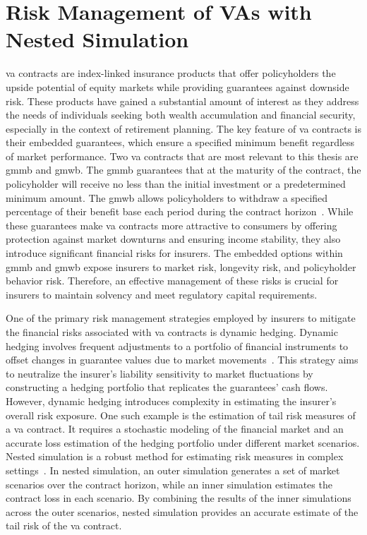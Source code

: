 \section{Risk Management of VAs with Nested Simulation}

\gls{va} contracts are index-linked insurance products that offer policyholders the upside potential of equity markets while providing guarantees against downside risk.
These products have gained a substantial amount of interest as they address the needs of individuals seeking both wealth accumulation and financial security, especially in the context of retirement planning.
The key feature of \gls{va} contracts is their embedded guarantees, which ensure a specified minimum benefit regardless of market performance.
Two \gls{va} contracts that are most relevant to this thesis are \gls{gmmb} and \gls{gmwb}.
The \gls{gmmb} guarantees that at the maturity of the contract, the policyholder will receive no less than the initial investment or a predetermined minimum amount.
The \gls{gmwb} allows policyholders to withdraw a specified percentage of their benefit base each period during the contract horizon~\citep{hardy2003investment}.
While these guarantees make \gls{va} contracts more attractive to consumers by offering protection against market downturns and ensuring income stability, they also introduce significant financial risks for insurers.
The embedded options within \gls{gmmb} and \gls{gmwb} expose insurers to market risk, longevity risk, and policyholder behavior risk.
Therefore, an effective management of these risks is crucial for insurers to maintain solvency and meet regulatory capital requirements.

One of the primary risk management strategies employed by insurers to mitigate the financial risks associated with \gls{va} contracts is dynamic hedging.
Dynamic hedging involves frequent adjustments to a portfolio of financial instruments to offset changes in guarantee values due to market movements~\citep{hull2016options}.
This strategy aims to neutralize the insurer's liability sensitivity to market fluctuations by constructing a hedging portfolio that replicates the guarantees' cash flows.
However, dynamic hedging introduces complexity in estimating the insurer's overall risk exposure.
One such example is the estimation of tail risk measures of a \gls{va} contract.
It requires a stochastic modeling of the financial market and an accurate loss estimation of the hedging portfolio under different market scenarios.
Nested simulation is a robust method for estimating risk measures in complex settings~\citep{gordy2010nested}.
In nested simulation, an outer simulation generates a set of market scenarios over the contract horizon, while an inner simulation estimates the contract loss in each scenario.
By combining the results of the inner simulations across the outer scenarios, nested simulation provides an accurate estimate of the tail risk of the \gls{va} contract.

